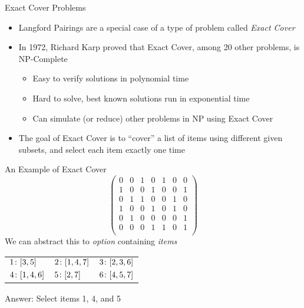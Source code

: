 \documentclass[aspectratio=169]{beamer}
\begin{document}
\begin{frame}{Exact Cover Problems}
    \begin{itemize}
        \item Langford Pairings are a special case of a type of problem called \emph{Exact Cover} \pause
        \item In 1972, Richard Karp proved that Exact Cover, among 20 other problems, is \textcolor{sigma@mainblue}{NP-Complete}
        \begin{itemize}
            \item Easy to verify solutions in polynomial time
            \item Hard to solve, best known solutions run in exponential time 
            \item Can simulate (or reduce) other problems in NP using Exact Cover
        \end{itemize} \pause
        \item The goal of Exact Cover is to ``cover'' a list of items using different given subsets, and select each item exactly one time
    \end{itemize}
\end{frame}

\begin{frame}{An Example of Exact Cover}
    \[
        \begin{pmatrix}
            0 & 0 & 1 & 0 & 1 & 0 & 0 \\
            1 & 0 & 0 & 1 & 0 & 0 & 1 \\
            0 & 1 & 1 & 0 & 0 & 1 & 0 \\
            1 & 0 & 0 & 1 & 0 & 1 & 0 \\
            0 & 1 & 0 & 0 & 0 & 0 & 1 \\
            0 & 0 & 0 & 1 & 1 & 0 & 1 \\
        \end{pmatrix}
    \] \pause 
    We can abstract this to \emph{option} containing \emph{items}
    \begin{table}[]
        \begin{tabular}{ l l l }
            $1\colon \bqty{3, 5}$& $2\colon \bqty{1, 4, 7}$ & $3\colon \bqty{2, 3, 6}$ \\ 
            $4\colon \bqty{1, 4, 6}$ & $5\colon \bqty{2, 7}$ & $6\colon \bqty{4, 5, 7}$ \\ 
        \end{tabular}
    \end{table} \pause
    \textcolor{sigma@mainblue}{Answer:} Select items 1, 4, and 5
\end{frame}
\end{document}

